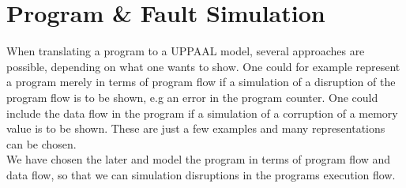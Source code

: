 \section{Program \& Fault Simulation}
When translating a program to a UPPAAL model, several approaches are possible, depending on what one wants to show. One could for example represent a program merely in terms of program flow if a simulation of a disruption of the program flow is to be shown, e.g an error in the program counter. One could include the data flow in the program if a simulation of a corruption of a memory value is to be shown. These are just a few examples and many representations can be chosen.\\

We have chosen the later and model the program in terms of program flow and data flow, so that we can simulation disruptions in the programs execution flow. 



